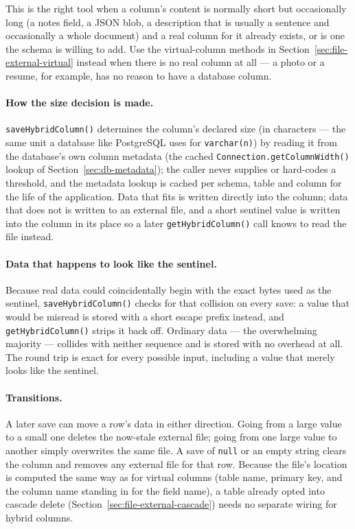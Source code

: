 \noindent
This is the right tool when a column's content is normally short but occasionally long (a notes field, a JSON blob, a description that is usually a sentence and occasionally a whole document) and a real column for it already exists, or is one the schema is willing to add. Use the virtual-column methods in Section~\ref{sec:file-external-virtual} instead when there is no real column at all --- a photo or a resume, for example, has no reason to have a database column.

\paragraph{How the size decision is made.} \texttt{saveHybridColumn()} determines the column's declared size (in characters --- the same unit a database like PostgreSQL uses for \texttt{varchar(n)}) by reading it from the database's own column metadata (the cached \texttt{Connection.getColumnWidth()} lookup of Section~\ref{sec:db-metadata}); the caller never supplies or hard-codes a threshold, and the metadata lookup is cached per schema, table and column for the life of the application. Data that fits is written directly into the column; data that does not is written to an external file, and a short sentinel value is written into the column in its place so a later \texttt{getHybridColumn()} call knows to read the file instead.

\paragraph{Data that happens to look like the sentinel.} Because real data could coincidentally begin with the exact bytes used as the sentinel, \texttt{saveHybridColumn()} checks for that collision on every save: a value that would be misread is stored with a short escape prefix instead, and \texttt{getHybridColumn()} strips it back off. Ordinary data --- the overwhelming majority --- collides with neither sequence and is stored with no overhead at all. The round trip is exact for every possible input, including a value that merely looks like the sentinel.

\paragraph{Transitions.} A later save can move a row's data in either direction. Going from a large value to a small one deletes the now-stale external file; going from one large value to another simply overwrites the same file. A save of \texttt{null} or an empty string clears the column and removes any external file for that row. Because the file's location is computed the same way as for virtual columns (table name, primary key, and the column name standing in for the field name), a table already opted into cascade delete (Section~\ref{sec:file-external-cascade}) needs no separate wiring for hybrid columns.

